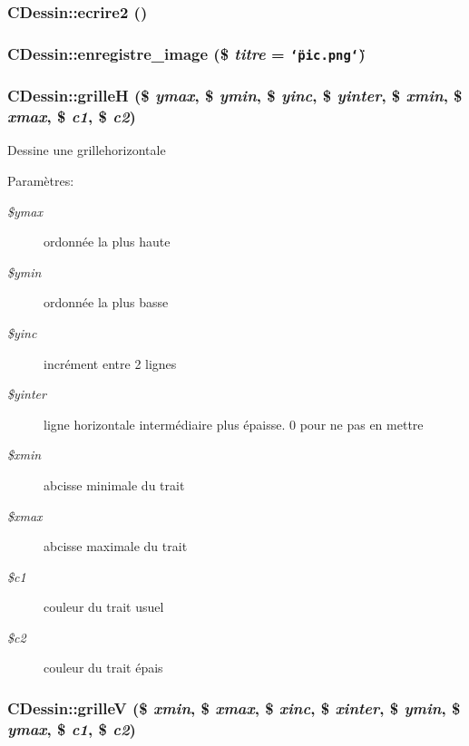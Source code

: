 \hypertarget{classCDessin_a21}{
\subsubsection[ecrire2]{\setlength{\rightskip}{0pt plus 5cm}CDessin::ecrire2 ()}}
\label{classCDessin_a21}


\hypertarget{classCDessin_a14}{
\subsubsection[enregistre\_\-image]{\setlength{\rightskip}{0pt plus 5cm}CDessin::enregistre\_\-image (\$ {\em titre} = {\tt \char`\"{}pic.png\char`\"{}})}}
\label{classCDessin_a14}


\hypertarget{classCDessin_a22}{
\subsubsection[grilleH]{\setlength{\rightskip}{0pt plus 5cm}CDessin::grille\-H (\$ {\em ymax}, \$ {\em ymin}, \$ {\em yinc}, \$ {\em yinter}, \$ {\em xmin}, \$ {\em xmax}, \$ {\em c1}, \$ {\em c2})}}
\label{classCDessin_a22}


Dessine une grillehorizontale \begin{Desc}
\item[Param\`{e}tres:]
\begin{description}
\item[{\em \$ymax}]ordonn\'{e}e la plus haute \item[{\em \$ymin}]ordonn\'{e}e la plus basse \item[{\em \$yinc}]incr\'{e}ment entre 2 lignes \item[{\em \$yinter}]ligne horizontale interm\'{e}diaire plus \'{e}paisse. 0 pour ne pas en mettre \item[{\em \$xmin}]abcisse minimale du trait \item[{\em \$xmax}]abcisse maximale du trait \item[{\em \$c1}]couleur du trait usuel \item[{\em \$c2}]couleur du trait \'{e}pais\end{description}
\end{Desc}
\hypertarget{classCDessin_a23}{
\subsubsection[grilleV]{\setlength{\rightskip}{0pt plus 5cm}CDessin::grille\-V (\$ {\em xmin}, \$ {\em xmax}, \$ {\em xinc}, \$ {\em xinter}, \$ {\em ymin}, \$ {\em ymax}, \$ {\em c1}, \$ {\em c2})}}
\label{classCDessin_a23}


